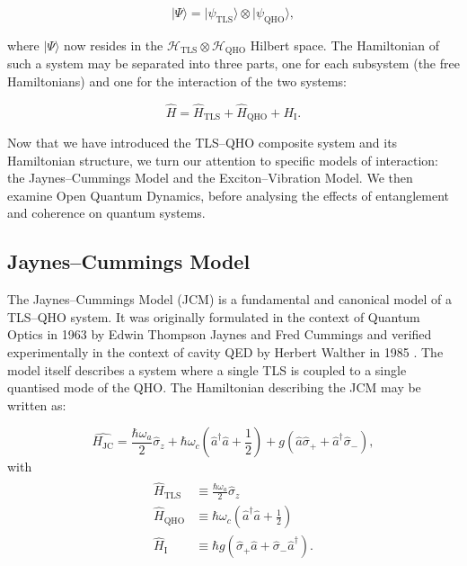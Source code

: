\documentclass[12pt]{article}
\begin{document}
\begin{equation}
    |\Psi\rangle = |\psi_{\scriptscriptstyle \text{TLS}}\rangle \otimes |\psi_{\scriptscriptstyle \text{QHO}}\rangle,
\end{equation}

where $|\Psi\rangle$ now resides in the $\mathcal{H}_{\scriptscriptstyle \text{TLS}} \otimes\mathcal{H}_{\scriptscriptstyle \text{QHO}}$ Hilbert space. The Hamiltonian of such a system may be separated into three parts, one for each subsystem (the free Hamiltonians) and one for the interaction of the two systems:

\begin{equation}
    \hat{H} = \hat{H}_{\scriptscriptstyle \text{TLS}} + \hat{H}_{\scriptscriptstyle \text{QHO}} + H_{\scriptscriptstyle \text{I}}.
\end{equation}

Now that we have introduced the TLS–QHO composite system and its Hamiltonian structure, we turn our attention to specific models of interaction: the Jaynes–Cummings Model and the Exciton–Vibration Model. We then examine Open Quantum Dynamics, before analysing the effects of entanglement and coherence on quantum systems.

\subsection{Jaynes--Cummings Model} \label{JCM_Theory}

The Jaynes--Cummings Model (JCM) is a fundamental and canonical model of a TLS--QHO system. It was originally formulated in the context of Quantum Optics in 1963 by Edwin Thompson Jaynes and Fred Cummings \cite{Context1963-JC_Original} and verified experimentally in the context of cavity QED by Herbert Walther in 1985 \cite{Context1993-JC_Verification}. The model itself describes a system where a single TLS is coupled to a single quantised mode of the QHO. The Hamiltonian describing the JCM may be written as:

\begin{equation} \label{JC_H}
    \hat{H_{\scriptscriptstyle \text{JC}}} = \frac{\hbar\omega_a}{2}\hat{\sigma}_z + \hbar\omega_c\left(\hat{a}^\dagger \hat{a} + \frac{1}{2} \right) + g(\hat{a}\hat{\sigma}_{+} + \hat{a}^\dagger\hat{\sigma}_{-}), 
\end{equation} 
with 
\begin{align*}
    \begin{aligned}
        \hat{H}_{\scriptscriptstyle \text{TLS}} &\equiv \frac{\hbar\omega_a}{2}\hat{\sigma}_z \\
        \hat{H}_{\scriptscriptstyle \text{QHO}} &\equiv \hbar\omega_c\left(\hat{a}^\dagger \hat{a} + \frac{1}{2} \right) \\
        \hat{H}_{\scriptscriptstyle \text{I}} &\equiv \hbar g(\hat{\sigma}_{+}\hat{a} +\hat{\sigma}_{-}\hat{a}^\dagger).
    \end{aligned}
\end{align*}
\end{document}
